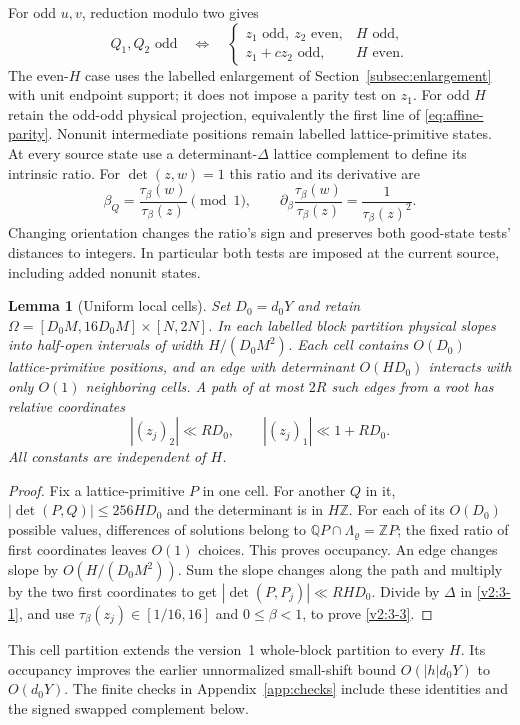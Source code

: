 \documentclass[11pt]{article}
\newtheorem{lemma}[theorem]{Lemma}
\theoremstyle{definition}
\newcommand{\Z}{\mathbb Z}
\newcommand{\Q}{\mathbb Q}
\theoremstyle{remark}
\numberwithin{equation}{section}
\begin{document}
For odd $u,v$, reduction modulo two gives
\begin{equation}\label{eq:affine-parity}
 Q_1,Q_2\text{ odd}\quad\Longleftrightarrow\quad
 \begin{cases}z_1\text{ odd},\ z_2\text{ even},&H\text{ odd},\\
 z_1+cz_2\text{ odd},&H\text{ even}.
 \end{cases}
\end{equation}
The even-$H$ case uses the labelled enlargement of
Section~\ref{subsec:enlargement} with unit endpoint support;
it does not impose a parity test on $z_1$.
For odd $H$ retain the odd-odd physical projection, equivalently
the first line of \eqref{eq:affine-parity}. Nonunit intermediate
positions remain labelled lattice-primitive states.
At every source state use a determinant-$\Delta$ lattice
complement to define its intrinsic ratio. For
$\det(z,w)=1$ this ratio and its derivative are
\begin{equation}\label{v2:4-4}
 \beta_Q=\frac{\tau_\beta(w)}{\tau_\beta(z)}\pmod1,
 \qquad\partial_\beta\frac{\tau_\beta(w)}{\tau_\beta(z)}
       =\frac1{\tau_\beta(z)^2}.
\end{equation}
Changing orientation changes the ratio's sign and preserves both
good-state tests' distances to integers. In particular both tests
are imposed at the current source, including added nonunit states.

\begin{lemma}[Uniform local cells]\label{lem:slope-cells}
Set $D_0=d_0Y$ and retain
$\Omega=[D_0M,16D_0M]\times[N,2N]$. In each labelled block
partition physical slopes into half-open intervals of width
$H/(D_0M^2)$. Each cell contains $O(D_0)$ lattice-primitive
positions, and an edge with determinant $O(HD_0)$ interacts with
only $O(1)$ neighboring cells. A path of at most $2R$ such edges
from a root has relative coordinates
\begin{equation}\label{v2:3-3}
 |(z_j)_2|\ll RD_0,\qquad |(z_j)_1|\ll1+RD_0.
\end{equation}
All constants are independent of $H$.
\end{lemma}
\begin{proof}
Fix a lattice-primitive $P$ in one cell. For another $Q$ in it,
$|\det(P,Q)|\le256HD_0$ and the determinant is in $H\Z$.
For each of its $O(D_0)$ possible values, differences of solutions
belong to $\Q P\cap\Lambda_\varrho=\Z P$; the fixed ratio of
first coordinates leaves $O(1)$ choices. This proves occupancy.
An edge changes slope by $O(H/(D_0M^2))$. Sum the slope changes
along the path and multiply by the two first coordinates to get
$|\det(P,P_j)|\ll RHD_0$. Divide by $\Delta$ in
\eqref{v2:3-1}, and use $\tau_\beta(z_j)\in[1/16,16]$ and
$0\le\beta<1$, to prove \eqref{v2:3-3}.
\end{proof}
This cell partition extends the version~1 whole-block partition
to every $H$. Its occupancy improves the earlier unnormalized
small-shift bound $O(|h|d_0Y)$ to $O(d_0Y)$.
The finite checks in Appendix~\ref{app:checks} include these identities
and the signed swapped complement below.
\end{document}
